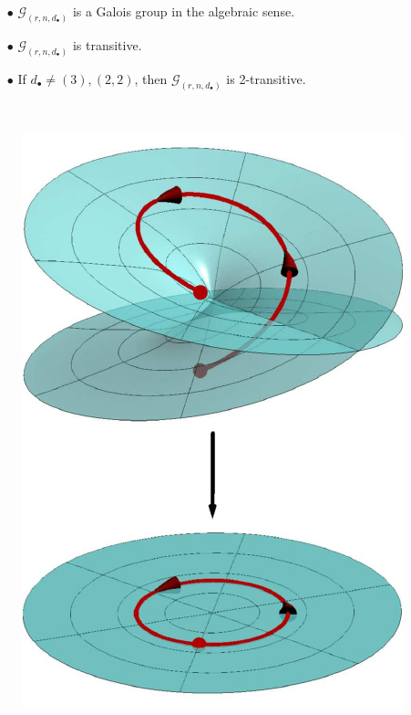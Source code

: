 \documentclass[final]{beamer}
\theoremstyle{thrm}
\begin{document}
\begin{frame}
\begin{minipage}[t]{.3\textwidth}
\begin{minipage}{.65\textwidth}
\begin{enumerate}
\item[$\bullet$] $\mathcal{G}_{(r,n,d_\bullet)}$ is a Galois group in the algebraic sense.

\item[$\bullet$] $\mathcal{G}_{(r,n,d_\bullet)}$ is transitive.

\item[$\bullet$] If $d_\bullet\ne (3),(2,2)$, then $\mathcal{G}_{(r,n,d_\bullet)}$ is 2-transitive.
\end{enumerate}
\end{minipage}
%
\begin{minipage}{.02\textwidth}
~
\end{minipage}
%
\begin{minipage}{.3\textwidth}
\begin{center}
\begin{figure}
\includegraphics[scale=1]{figures/monodromy.pdf}
\end{figure}
\end{center}
\end{minipage}


\end{minipage}
\end{frame}
\end{document}
